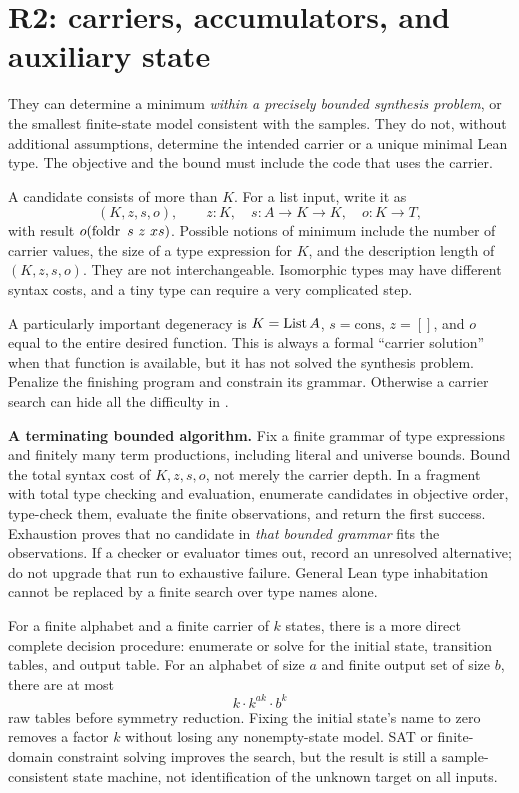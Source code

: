 \section{R2: carriers, accumulators, and auxiliary state}
\label{sec:carriers}

\ans They can determine a minimum \emph{within a precisely bounded synthesis problem}, or the smallest finite-state model consistent with the samples. They do not, without additional assumptions, determine the intended carrier or a unique minimal Lean type. The objective and the bound must include the code that uses the carrier.

A candidate consists of more than $K$. For a list input, write it as
\[
  (K,z,s,o),\qquad z:K,\quad s:A\to K\to K,\quad o:K\to T,
\]
with result $o(\operatorname{foldr}\ s\ z\ xs)$. Possible notions of minimum include the number of carrier values, the size of a type expression for $K$, and the description length of $(K,z,s,o)$. They are not interchangeable. Isomorphic types may have different syntax costs, and a tiny type can require a very complicated step.

A particularly important degeneracy is $K=\operatorname{List} A$, $s=\mathrm{cons}$, $z=[]$, and $o$ equal to the entire desired function. This is always a formal ``carrier solution'' when that function is available, but it has not solved the synthesis problem. Penalize the finishing program and constrain its grammar. Otherwise a carrier search can hide all the difficulty in .

\textbf{A terminating bounded algorithm.} Fix a finite grammar of type expressions and finitely many term productions, including literal and universe bounds. Bound the total syntax cost of $K,z,s,o$, not merely the carrier depth. In a fragment with total type checking and evaluation, enumerate candidates in objective order, type-check them, evaluate the finite observations, and return the first success. Exhaustion proves that no candidate in \emph{that bounded grammar} fits the observations. If a checker or evaluator times out, record an unresolved alternative; do not upgrade that run to exhaustive failure. General Lean type inhabitation cannot be replaced by a finite search over type names alone.

For a finite alphabet and a finite carrier of $k$ states, there is a more direct complete decision procedure: enumerate or solve for the initial state, transition tables, and output table. For an alphabet of size $a$ and finite output set of size $b$, there are at most
\[
  k\cdot k^{ak}\cdot b^k
\]
raw tables before symmetry reduction. Fixing the initial state's name to zero removes a factor $k$ without losing any nonempty-state model. SAT or finite-domain constraint solving improves the search, but the result is still a sample-consistent state machine, not identification of the unknown target on all inputs.


